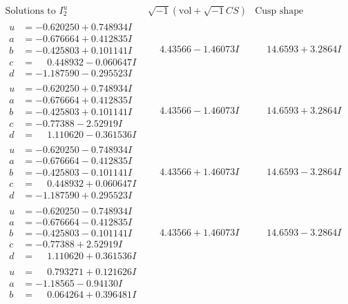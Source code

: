 \documentclass[1p]{elsarticle_modified}
\theoremstyle{definition}
\newcommand{\I}{\sqrt{-1}}
\begin{document}
$$\begin{array}{c|c|c}  
\text{Solutions to }I^u_{2}& \I (\text{vol} + \sqrt{-1}CS) & \text{Cusp shape}\\
 \hline 
\begin{aligned}
u &= -0.620250 + 0.748934 I \\
a &= -0.676664 + 0.412835 I \\
b &= -0.425803 + 0.101141 I \\
c &= \phantom{-}0.448932 - 0.060647 I \\
d &= -1.187590 - 0.295523 I\end{aligned}
 & \phantom{-}4.43566 - 1.46073 I & \phantom{-}14.6593 + 3.2864 I \\ \hline\begin{aligned}
u &= -0.620250 + 0.748934 I \\
a &= -0.676664 + 0.412835 I \\
b &= -0.425803 + 0.101141 I \\
c &= -0.77388 - 2.52919 I \\
d &= \phantom{-}1.110620 - 0.361536 I\end{aligned}
 & \phantom{-}4.43566 - 1.46073 I & \phantom{-}14.6593 + 3.2864 I \\ \hline\begin{aligned}
u &= -0.620250 - 0.748934 I \\
a &= -0.676664 - 0.412835 I \\
b &= -0.425803 - 0.101141 I \\
c &= \phantom{-}0.448932 + 0.060647 I \\
d &= -1.187590 + 0.295523 I\end{aligned}
 & \phantom{-}4.43566 + 1.46073 I & \phantom{-}14.6593 - 3.2864 I \\ \hline\begin{aligned}
u &= -0.620250 - 0.748934 I \\
a &= -0.676664 - 0.412835 I \\
b &= -0.425803 - 0.101141 I \\
c &= -0.77388 + 2.52919 I \\
d &= \phantom{-}1.110620 + 0.361536 I\end{aligned}
 & \phantom{-}4.43566 + 1.46073 I & \phantom{-}14.6593 - 3.2864 I \\ \hline\begin{aligned}
u &= \phantom{-}0.793271 + 0.121626 I \\
a &= -1.18565 - 0.94130 I \\
b &= \phantom{-}0.064264 + 0.396481 I \\

\end{aligned}
\end{array}$$
\end{document}
